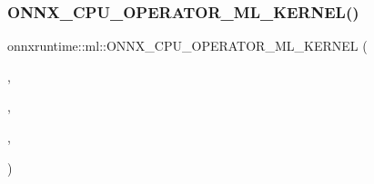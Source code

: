 \subsubsection{\texorpdfstring{O\+N\+N\+X\+\_\+\+C\+P\+U\+\_\+\+O\+P\+E\+R\+A\+T\+O\+R\+\_\+\+M\+L\+\_\+\+K\+E\+R\+N\+E\+L()}{ONNX\_CPU\_OPERATOR\_ML\_KERNEL()}\hspace{0.1cm}{\footnotesize\ttfamily [11/11]}}
{\footnotesize\ttfamily onnxruntime\+::ml\+::\+O\+N\+N\+X\+\_\+\+C\+P\+U\+\_\+\+O\+P\+E\+R\+A\+T\+O\+R\+\_\+\+M\+L\+\_\+\+K\+E\+R\+N\+EL (\begin{DoxyParamCaption}\item[{Imputer}]{,  }\item[{1}]{,  }\item[{\mbox{\hyperlink{classonnxruntime_1_1KernelDefBuilder}{Kernel\+Def\+Builder}}().Type\+Constraint(\char`\"{}T\char`\"{}, \{Data\+Type\+Impl\+::\+Get\+Tensor\+Type$<$ float $>$(), \mbox{\hyperlink{classonnxruntime_1_1DataTypeImpl_a7c4a6a7126bc7661eb67af6dfcfad1fb}{Data\+Type\+Impl\+::\+Get\+Tensor\+Type}}$<$ int64\+\_\+t $>$()\})}]{,  }\item[{\mbox{\hyperlink{classonnxruntime_1_1ml_1_1ImputerOp}{Imputer\+Op}}}]{ }\end{DoxyParamCaption})}

\mbox{\label{namespaceonnxruntime_1_1ml_a34aebc377bd061c373c653dcda288d1b}} 
